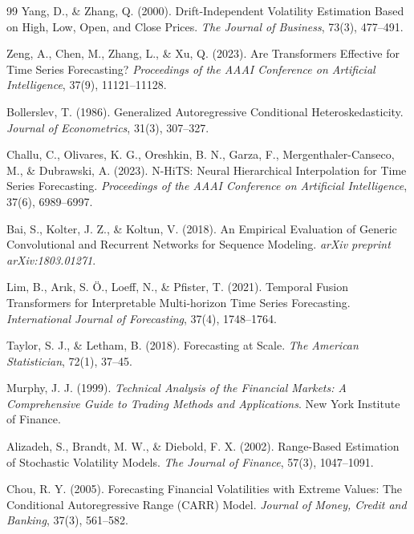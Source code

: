 \documentclass[11pt,a4paper]{article}
\begin{document}
\begin{thebibliography}{99}
Yang, D., \& Zhang, Q. (2000).
\newblock Drift-Independent Volatility Estimation Based on High, Low, Open, and Close Prices.
\newblock \textit{The Journal of Business}, 73(3), 477--491.

Zeng, A., Chen, M., Zhang, L., \& Xu, Q. (2023).
\newblock Are Transformers Effective for Time Series Forecasting?
\newblock \textit{Proceedings of the AAAI Conference on Artificial Intelligence}, 37(9), 11121--11128.

Bollerslev, T. (1986).
\newblock Generalized Autoregressive Conditional Heteroskedasticity.
\newblock \textit{Journal of Econometrics}, 31(3), 307--327.

Challu, C., Olivares, K. G., Oreshkin, B. N., Garza, F., Mergenthaler-Canseco, M., \& Dubrawski, A. (2023).
\newblock N-HiTS: Neural Hierarchical Interpolation for Time Series Forecasting.
\newblock \textit{Proceedings of the AAAI Conference on Artificial Intelligence}, 37(6), 6989--6997.

Bai, S., Kolter, J. Z., \& Koltun, V. (2018).
\newblock An Empirical Evaluation of Generic Convolutional and Recurrent Networks for Sequence Modeling.
\newblock \textit{arXiv preprint arXiv:1803.01271}.

Lim, B., Arık, S. Ö., Loeff, N., \& Pfister, T. (2021).
\newblock Temporal Fusion Transformers for Interpretable Multi-horizon Time Series Forecasting.
\newblock \textit{International Journal of Forecasting}, 37(4), 1748--1764.

Taylor, S. J., \& Letham, B. (2018).
\newblock Forecasting at Scale.
\newblock \textit{The American Statistician}, 72(1), 37--45.

Murphy, J. J. (1999).
\newblock \textit{Technical Analysis of the Financial Markets: A Comprehensive Guide to Trading Methods and Applications}.
\newblock New York Institute of Finance.

Alizadeh, S., Brandt, M. W., \& Diebold, F. X. (2002).
\newblock Range-Based Estimation of Stochastic Volatility Models.
\newblock \textit{The Journal of Finance}, 57(3), 1047--1091.

Chou, R. Y. (2005).
\newblock Forecasting Financial Volatilities with Extreme Values: The Conditional Autoregressive Range (CARR) Model.
\newblock \textit{Journal of Money, Credit and Banking}, 37(3), 561--582.


\end{thebibliography}
\end{document}

